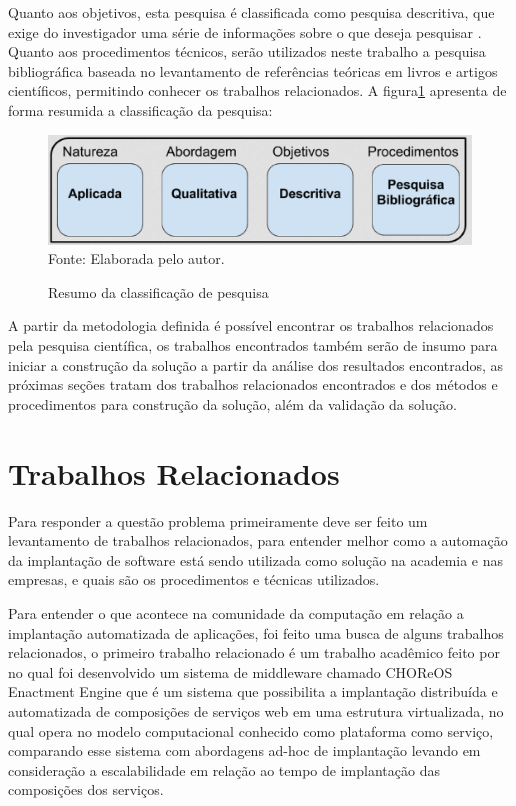 Quanto aos objetivos, esta pesquisa é classificada como pesquisa descritiva, que
exige do investigador uma série de informações sobre o que deseja pesquisar
\cite{trivinos1987introduccao}. Quanto aos procedimentos técnicos, serão utilizados
neste trabalho a pesquisa bibliográfica baseada no levantamento de referências
teóricas em livros e artigos científicos, permitindo conhecer os trabalhos
relacionados. A figura\ref{fig:metodologia1} apresenta de forma resumida a
classificação da pesquisa:

\begin{figure}[h]
  \centering
  \caption{Resumo da classificação de pesquisa}
  \includegraphics[width=1.0\textwidth]
      {figuras/met1.eps}
      Fonte: Elaborada pelo autor.
\label{fig:metodologia1}
\end{figure}

A partir da metodologia definida é possível encontrar os trabalhos relacionados
pela pesquisa científica, os trabalhos encontrados também serão de insumo para iniciar
a construção da solução a partir da análise dos resultados encontrados,
as próximas seções tratam dos trabalhos relacionados encontrados e dos métodos e
procedimentos para construção da solução, além da validação da solução.

\section{Trabalhos Relacionados}
\label{section:trabalhos_relacionados}
Para responder a questão problema primeiramente deve ser feito um levantamento
de trabalhos relacionados, para entender melhor como a automação da implantação
de software está sendo utilizada como solução na academia e nas empresas, e
quais são os procedimentos e técnicas utilizados.

Para entender o que acontece na comunidade da computação em relação a implantação
automatizada de aplicações, foi feito uma busca de alguns trabalhos relacionados, o primeiro
trabalho relacionado é um trabalho acadêmico feito por\cite{leo2014} no qual foi
desenvolvido um sistema de middleware chamado CHOReOS Enactment Engine que é um
sistema que possibilita a implantação distribuída e automatizada de composições
de serviços web em uma estrutura virtualizada, no qual opera no modelo
computacional conhecido como plataforma como serviço, comparando esse sistema
com abordagens ad-hoc de implantação levando em consideração a escalabilidade
em relação ao tempo de implantação das composições dos serviços.

